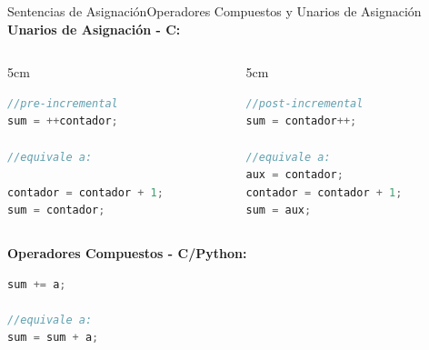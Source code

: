 \documentclass{beamer}
\begin{document}
\begin{frame}[fragile]{Sentencias de Asignación}{Operadores Compuestos y Unarios de Asignación}
\small
\textbf{Unarios de Asignación - C:}
\vspace{-.3cm}
\begin{columns}[t]
	\begin{column}{5cm}\begin{exampleblock}{}
	\begin{lstlisting}[language=C, basicstyle=\scriptsize] 
//pre-incremental
sum = ++contador; 

//equivale a:

contador = contador + 1;
sum = contador;
		\end{lstlisting}\end{exampleblock}
	\end{column}
	\begin{column}{5cm}\begin{exampleblock}{}
	\begin{lstlisting}[language=C, basicstyle=\scriptsize] 
//post-incremental
sum = contador++;
 
//equivale a:
aux = contador;
contador = contador + 1;
sum = aux;
		\end{lstlisting}\end{exampleblock}
	\end{column}
\end{columns}
\vspace{.2cm}
\textbf{Operadores Compuestos - C/Python:}
\begin{block}{}
\begin{lstlisting}[language=C, basicstyle=\scriptsize] 
sum += a;

//equivale a:
sum = sum + a;
\end{lstlisting}\end{block}
\end{frame}
\end{document}
